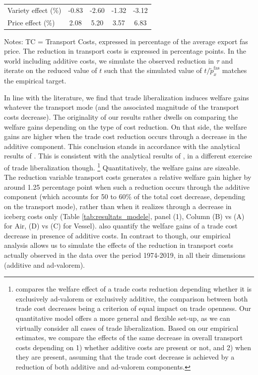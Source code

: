 \documentclass[a4paper,11pt]{article}
\begin{document}
\begin{table}[htbp]
\begin{center}
\begin{tabular}{l||c|c||c|c}
Variety effect (\%)& -0.83 	&-2.60	&-1.32	& -3.12 \\
Price effect (\%)&2.08 &5.20	&3.57	& 6.83  \\
\hline
\end{tabular}
\end{center}
{\parbox[l]{10cm}{ \vspace{4pt}\footnotesize{Notes: TC = Transport Costs, expressed in percentage of the average export fas price. The reduction in transport costs is expressed in percentage points. In the world including additive costs, we simulate the observed reduction in $\tau$ and iterate on the reduced value of $t$ such that the simulated value of $t/\widetilde{p}_x^{\text{fas}}$ matches the empirical target.  }}}
\end{table}



In line with the literature, we find that trade liberalization induces welfare gains whatever the transport mode (and the associated magnitude of the transport costs decrease). The originality of our results rather dwells on comparing the welfare gains depending on the type of cost reduction. On that side, the welfare gains are higher when the trade cost reduction occurs through a decrease in the additive component. This conclusion stands in accordance with the analytical results of \cite{sorensen2014}. This is consistent with the analytical results of \cite{sorensen2014}, in a different exercise of trade liberalization though. \footnote{\cite{sorensen2014} compares the welfare effect of a trade costs reduction depending whether it is exclusively ad-valorem or exclusively additive, the comparison between both trade cost decreases being a criterion of equal impact on trade openness. Our quantitative model offers a more general and flexible set-up, as we can virtually consider all cases of trade liberalization. Based on our empirical estimates, we compare the effects of the same decrease in overall transport costs depending on 1) whether additive costs are present or not, and 2) when they are present, assuming that the trade cost decrease is achieved by a reduction of both additive and ad-valorem components.} Quantitatively, the welfare gains are sizeable. The reduction variable transport costs generates a relative welfare gain higher by around 1.25 percentage point when such a reduction occurs through the additive component (which accounts for 50 to 60\% of the total cost decrease, depending on the transport mode), rather than when it realizes through a decrease in iceberg costs only (Table \ref{tab:resultats_modele}, panel (1), Column (B) vs (A) for Air, (D) vs (C) for Vessel). \cite{Irrazabal_2015} also quantify the welfare gains of a trade cost decrease in presence of additive costs. In contrast to \cite{Irrazabal_2015} though, our empirical analysis allows us to simulate the effects of the reduction in transport costs actually observed in the data over the period 1974-2019, in all their dimensions (additive and ad-valorem). \smallskip
\end{document}
